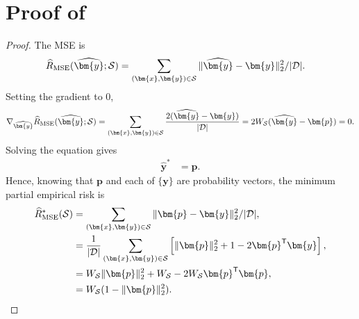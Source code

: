 \documentclass[letterpaper]{article} %
\newcommand{\bx}{{\bm{x}}}
\newcommand{\bp}{{\bm{p}}}
\newcommand{\by}{{\bm{y}}}
\newcommand{\T}{{\mathsf{T}}}
\newcommand{\cS}{{\cal{S}}}
\newcommand{\cD}{{\cal{D}}}
\begin{document}
\clearpage
\appendix
\section{Proof of }
\label{app:equivalence_thm}
\lie*
\begin{proof}
    The MSE is
    \begin{align*}
        \widehat{R}_{\mathrm{MSE}}(\widehat{\by};\cS) &= \sum_{(\bx,\by)\in\cS} \|\widehat{\by}-\by\|_2^2/|\cD|.
    \end{align*}
    Setting the gradient to 0,
    \begin{align*}
        \nabla_{\widehat{\by}} \widehat{R}_{\mathrm{MSE}}(\widehat{\by};\cS)
        =  \sum_{(\bx,\by)\in\cS} \frac{2(\widehat{\by}-\by)}{|\cD|}
        = 2W_{\cS}(\widehat{\by}-\bp)
        = 0.
    \end{align*}
    Solving the equation gives
    \begin{align*}
        \widehat{\by}^* &= \bp.
    \end{align*}
    Hence, knowing that $\bp$ and each of $\{\by\}$ are probability vectors, the minimum partial empirical risk is
    \begin{align*}
        \widehat{R}_{\mathrm{MSE}}^*(\cS) &= \sum_{(\bx,\by)\in\cS} \| \bp-\by \|_2^2/|\cD|,
        \\
        &= \frac{1}{|\cD|} \sum_{(\bx,\by)\in\cS} \left[\|\bp\|_2^2 + 1 - 2\bp^\T\by\right],
        \\
        &= W_{\cS}\|\bp\|_2^2 + W_{\cS} - 2W_{\cS}\bp^\T \bp,
        \\
        &= W_{\cS}(1-\|\bp\|_2^2).
    \end{align*}


\end{proof}
\end{document}
